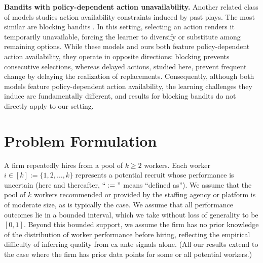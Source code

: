 \documentclass[opre,blindrev]{informs3}
\begin{document}
{\bf Bandits with policy-dependent action unavailability.}
Another related class of models studies action availability constraints induced by past plays. The most similar are blocking bandits \citep{basu2019blocking, atsidakou2021combinatorial}. In this setting, selecting an action renders it temporarily unavailable, forcing the learner to diversify or substitute among remaining options. While these models and ours both feature policy-dependent action availability, they operate in opposite directions: blocking prevents consecutive selections, whereas delayed actions, studied here, prevent frequent change by delaying the realization of replacements. Consequently, although both models feature policy-dependent action availability, the learning challenges they induce are fundamentally different, and results for blocking bandits do not directly apply to our setting.

\section{Problem Formulation}
\label{formulation}

A firm repeatedly hires from a pool of \(k \ge 2\) workers. Each worker \(i \in [k] := \{1,2,\dots,k\}\) represents a potential recruit whose performance is uncertain (here and thereafter, \(``:="\) means ``defined as''). We assume that the pool of \(k\) workers recommended or provided by the staffing agency or platform is of moderate size, as is typically the case.
We assume that all performance outcomes lie in a bounded interval, which we take without loss of generality to be \([0,1]\). 
Beyond this bounded support, we assume the firm has no prior knowledge of the distribution of worker performance before hiring, reflecting the empirical difficulty of inferring quality from ex ante signals alone. (All our results extend to the case where the firm has prior data points for some or all potential workers.)
\end{document}
